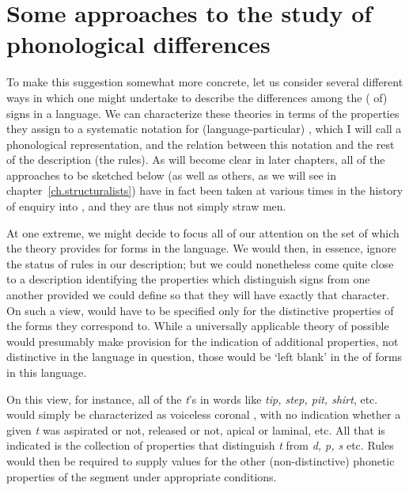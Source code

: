 \section{Some approaches to the study of phonological differences}

To make this suggestion somewhat more concrete, let us consider
several different ways in which one might undertake to describe the
differences among the (\emph{} of) signs in a language. We
can characterize these theories in terms of the properties they assign
to a systematic notation for (language-particular) \emph{},
which I will call a phonological representation, and the relation
between this notation and the rest of the description (the {rules}). As
will become clear in later chapters, all of the approaches to be
sketched below (as well as others, as we will see in
chapter~\ref{ch.structuralists}) have in fact been taken at various
times in the history of enquiry into , and they are
thus not simply straw men.

At one extreme, we might decide to focus all of our attention on the
set of  which the theory provides for
forms in the language. We would then, in essence, ignore the status of
{rules} in our description; but we could nonetheless come quite close to
a description identifying the properties which distinguish signs from
one another provided we could define  so
that they will have exactly that character. On such a view,
 would have to be specified only for the
distinctive properties of the forms they correspond to. While a
universally applicable theory of possible 
would presumably make provision for the indication of additional
properties, not distinctive in the language in question, those would
be `left blank' in the  of forms in this language.

On this view, for instance, all of the \emph{t}'s in  words
like \emph{tip, step, pit, shirt}, etc. would simply be characterized
as voiceless coronal , with no indication whether a given
\emph{t} was aspirated or not, released or not, apical or laminal,
etc. All that is indicated is the collection of properties that
distinguish \emph{t} from \emph{d, p, s} etc. Rules would then be
required to supply values for the other (non-distinctive) phonetic
properties of the segment under appropriate conditions.

